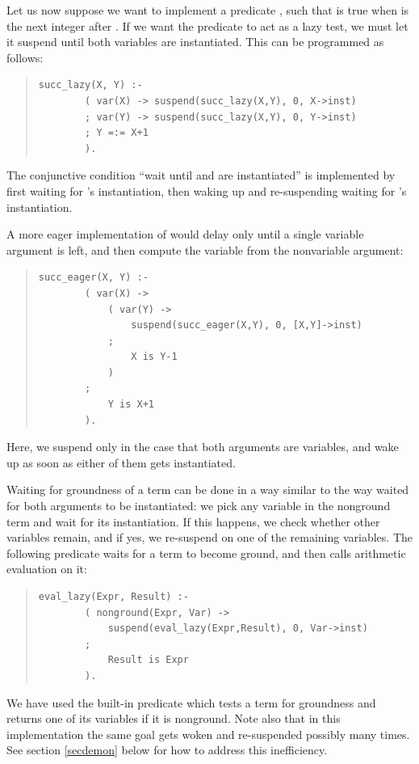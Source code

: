 {Let us now suppose we want to implement a predicate , such that
is true when  is the next integer after . If we want the
predicate
to act as a lazy test, we must let it suspend until both variables
are instantiated. This can be programmed as follows:
\begin{quote}
\begin{verbatim}
succ_lazy(X, Y) :-
        ( var(X) -> suspend(succ_lazy(X,Y), 0, X->inst)
        ; var(Y) -> suspend(succ_lazy(X,Y), 0, Y->inst)
        ; Y =:= X+1
        ).
\end{verbatim}
\end{quote}
The conjunctive condition ``wait until  and  are
instantiated''
is
implemented by first waiting for 's instantiation, then waking up and
re-suspending waiting for 's instantiation.

A more eager implementation of  would delay only until
a single variable argument is left, and then compute the variable from
the nonvariable argument:
\begin{quote}
\begin{verbatim}
succ_eager(X, Y) :-
        ( var(X) ->
            ( var(Y) ->
                suspend(succ_eager(X,Y), 0, [X,Y]->inst)
            ;
                X is Y-1
            )
        ;
            Y is X+1
        ).
\end{verbatim}
\end{quote}
Here, we suspend only in the case that both arguments are variables,
and wake up as soon as either of them gets instantiated.

Waiting for groundness of a term can be done in a way similar to the
way  waited for both arguments to be instantiated: we
pick
any variable in the nonground term and wait for its instantiation.
If this happens, we check whether other variables remain, and if yes,
we re-suspend on one of the remaining variables. The following predicate
waits for a term to become ground, and then calls arithmetic evaluation on it:
\begin{quote}
\begin{verbatim}
eval_lazy(Expr, Result) :-
        ( nonground(Expr, Var) ->
            suspend(eval_lazy(Expr,Result), 0, Var->inst)
        ;
            Result is Expr
        ).
\end{verbatim}
\end{quote}
We have used the built-in predicate
which tests a term for groundness and returns one of its variables
if it is nonground. Note also that in this implementation the same
 goal gets woken and re-suspended possibly many times.
See section \ref{secdemon} below for how to address this inefficiency.


}
